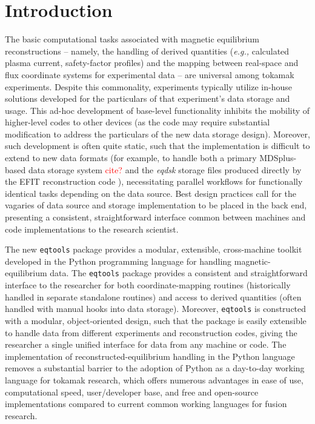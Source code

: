 \documentclass[12pt,floatfix,showpacs]{revtex4-1}
\newcommand{\eg}{\emph{e.g., }}
\newcommand{\note}[1]{\textcolor{red}{#1}}
\newcommand{\gnote}[1]{\marginpar{\scriptsize\textcolor{red}{#1}}}
\newcommand{\eqtools}{\texttt{eqtools}\xspace}
\begin{document}

\section{Introduction}\label{sec:intro}

The basic computational tasks associated with magnetic equilibrium reconstructions -- namely, the handling of derived quantities (\eg calculated plasma current, safety-factor profiles) and the mapping between real-space and flux coordinate systems for experimental data -- are universal among tokamak experiments.  Despite this commonality, experiments typically utilize in-house solutions developed for the particulars of that experiment's data storage and usage.  This ad-hoc development of base-level functionality inhibits the mobility of higher-level codes to other devices (as the code may require substantial modification to address the particulars of the new data storage design).  Moreover, such development is often quite static, such that the implementation is difficult to extend to new data formats (for example, to handle both a primary MDSplus-based data storage system \note{cite?} and the \emph{eqdsk} storage files produced directly by the EFIT reconstruction code \cite{Lao1985}), necessitating parallel workflows for functionally identical tasks depending on the data source.  Best design practices call for the vagaries of data source and storage implementation to be placed in the back end, presenting a consistent, straightforward interface common between machines and code implementations to the research scientist.

The new \eqtools package provides a modular, extensible, cross-machine toolkit developed in the Python programming language for handling magnetic-equilibrium data.  The \eqtools package provides a consistent and straightforward interface to the researcher for both coordinate-mapping routines (historically handled in separate standalone routines) and access to derived quantities (often handled with manual hooks into data storage).  Moreover, \eqtools is constructed with a modular, object-oriented design, such that the package is easily extensible to handle data from different experiments and reconstruction codes, giving the researcher a single unified interface for data from any machine or code.  The implementation of reconstructed-equilibrium handling in the Python language removes a substantial barrier to the adoption of Python as a day-to-day working language for tokamak research, which offers numerous advantages in ease of use, computational speed, user/developer base, and free and open-source implementations compared to current common working languages for fusion research.\gnote{where to point to github?}\gnote{Should we maybe flesh out the argument for Python a little more?}
\end{document}
